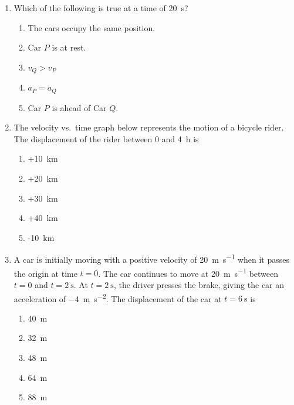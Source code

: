 \documentclass{../../../oss-apphys}
\begin{document}
\begin{multicols}{2}
\begin{enumerate}[resume,leftmargin=18pt]
  \item Which of the following is true at a time of \SI{20}{\second}?
    \begin{enumerate}[nosep,leftmargin=18pt,label=(\Alph*)]
    \item The cars occupy the same position.
    \item Car $P$ is at rest.
    \item $v_Q>v_P$
    \item $a_P=a_Q$
    \item Car $P$ is ahead of Car $Q$.
    \end{enumerate}
    \label{q:graph2}
    \vspace{.65in}
    
  \item The velocity vs.\ time graph below represents the motion of a bicycle
    rider. The displacement of the rider between $0$ and \SI{4}{\hour} is
    
    \begin{enumerate}[nosep,leftmargin=18pt,label=(\Alph*)]
    \item +\SI{10}{\kilo\metre}
    \item +\SI{20}{\kilo\metre}
    \item +\SI{30}{\kilo\metre}
    \item +\SI{40}{\kilo\metre}
    \item -\SI{10}{\kilo\metre}
    \end{enumerate}
    \columnbreak
    
  \item A car is initially moving with a positive velocity of
    \SI{20}{\metre\per\second} when it passes the origin at time $t=0$. The car
    continues to move at \SI{20}{\metre\per\second} between $t=0$ and
    $t=\SI{2}{\second}$. At $t=\SI{2}{\second}$, the driver presses the brake,
    giving the car an acceleration of \SI{-4}{\metre\per\second\squared}. The
    displacement of the car at $t=\SI{6}{\second}$ is
    \begin{enumerate}[nosep,leftmargin=18pt,label=(\Alph*)]
    \item\SI{40}{\metre}
    \item\SI{32}{\metre}
    \item\SI{48}{\metre}
    \item\SI{64}{\metre}
    \item\SI{88}{\metre}
    \end{enumerate}


\end{enumerate}
\end{multicols}
\end{document}
